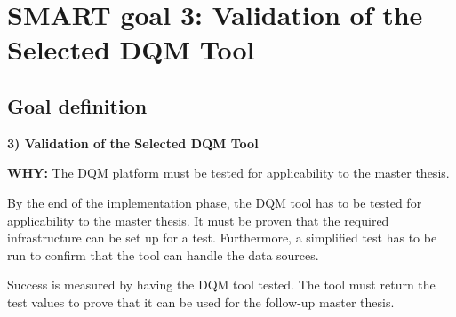 \section{SMART goal 3: Validation of the Selected DQM Tool}
\subsection*{Goal definition}
\textbf{3) Validation of the Selected DQM Tool}
    
\textbf{WHY:} The DQM platform must be tested for applicability to the master thesis.

By the end of the implementation phase, the DQM tool has to be tested for applicability to the master thesis. It must be proven that the required infrastructure can be set up for a test. Furthermore, a simplified test has to be run to confirm that the tool can handle the data sources.

Success is measured by having the DQM tool tested. The tool must return the test values to prove that it can be used for the follow-up master thesis.



